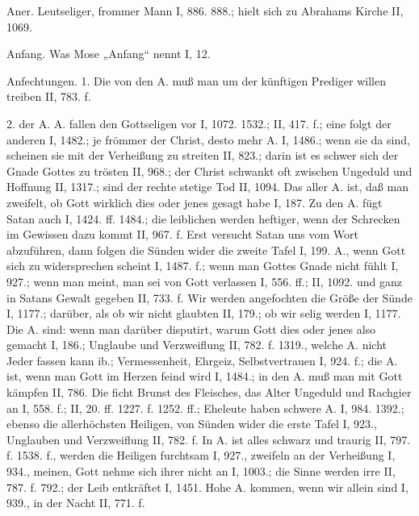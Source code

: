 Aner. Leutseliger, frommer Mann I, 886. 888.; hielt sich zu Abrahams Kirche II, 1069.

Anfang. Was Mose „Anfang“ nennt I, 12.

Anfechtungen. 1. Die  von den A. muß man um der künftigen Prediger willen treiben II, 783. f.

2.  der A.  A. fallen den Gottseligen vor I, 1072. 1532.; II, 417. f.; eine folgt der anderen I, 1482.; je frömmer der Christ, desto mehr A. I, 1486.; wenn sie da sind, scheinen sie mit der Verheißung zu streiten II, 823.; darin ist es schwer sich der Gnade Gottes zu trösten II, 968.; der Christ schwankt oft zwischen Ungeduld und Hoffnung II, 1317.; sind der rechte stetige Tod II, 1094. Das  aller A. ist, daß man zweifelt, ob Gott wirklich dies oder jenes gesagt habe I, 187. Zu den  A. fügt Satan auch  I, 1424. ff. 1484.; die leiblichen werden heftiger, wenn der Schrecken im Gewissen dazu kommt II, 967. f. Erst versucht Satan uns vom Wort abzuführen, dann folgen die Sünden wider die zweite Tafel I, 199.  A., wenn Gott sich zu widersprechen scheint I, 1487. f.; wenn man Gottes Gnade nicht fühlt I, 927.; wenn man meint, man sei von Gott verlassen I, 556. ff.; II, 1092. und ganz in Satans Gewalt gegeben II, 733. f. Wir werden angefochten  die Größe der Sünde I, 1177.; darüber, als ob wir nicht glaubten II, 179.; ob wir selig werden I, 1177. Die  A. sind: wenn man darüber disputirt, warum Gott dies oder jenes also gemacht I, 186.; Unglaube und Verzweiflung II, 782. f. 1319., welche A. nicht Jeder fassen kann ib.; Vermessenheit, Ehrgeiz, Selbstvertrauen I, 924. f.; die  A. ist, wenn man Gott im Herzen feind wird I, 1484.; in den  A. muß man mit Gott kämpfen II, 786. Die  ficht Brunst des Fleisches, das  Alter Ungeduld und Rachgier an I, 558. f.; II, 20. ff. 1227. f. 1252. ff.; Eheleute haben schwere A. I, 984. 1392.; ebenso die allerhöchsten Heiligen, von Sünden wider die erste Tafel I, 923., Unglauben und Verzweiflung II, 782. f. In A. ist alles schwarz und traurig II, 797. f. 1538. f., werden die Heiligen furchtsam I, 927., zweifeln an der Verheißung I, 934., meinen, Gott nehme sich ihrer nicht an I, 1003.; die Sinne werden irre II, 787. f. 792.; der Leib entkräftet I, 1451. Hohe A. kommen, wenn wir allein sind I, 939., in der Nacht II, 771. f.

